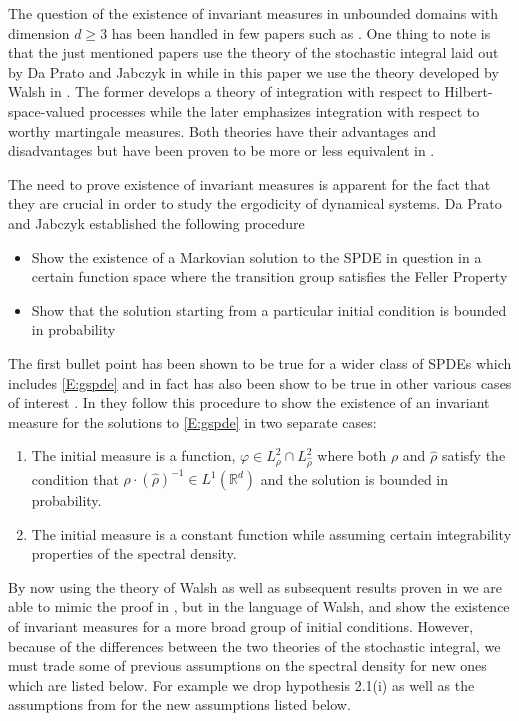 \documentclass[a4paper,11pt]{article}
\numberwithin{equation}{section}
\theoremstyle{plain}
\theoremstyle{definition}
\newcommand{\R}{\mathbb{R}}
\begin{document}
The question of the existence of invariant measures in unbounded domains with dimension $d \ge 3$ has been handled in
few papers such as \cite{TessitoreZabczyk98M, AM03, MSY15, MSY16}. One thing to note is that the just mentioned papers
use the theory of the stochastic integral laid out by Da Prato and Jabczyk in \cite{DZ92} while in this paper we use the
theory developed by Walsh in \cite{Walsh}. The former develops a theory of integration with respect to
Hilbert-space-valued processes while the later emphasizes integration with respect to worthy martingale measures. Both
theories have their advantages and disadvantages but have been proven to be more or less equivalent in \cite{DalQuer}. 

The need to prove existence of invariant measures is apparent for the fact that they are crucial in order to study the
ergodicity of dynamical systems. Da Prato and Jabczyk \cite{DZp92} established the following procedure 
\begin{itemize}
	\item Show the existence of a Markovian solution to the SPDE in question in a certain function space where the
		transition group satisfies the Feller Property 
	\item Show that the solution starting from a particular initial condition is bounded in probability
\end{itemize}
The first bullet point has been shown to be true \cite{DZ96} for a wider class of SPDEs which includes \eqref{E:gspde}
and in fact has also been show to be true in other various cases of interest \cite{Cer01, MS99}. 
In \cite{TessitoreZabczyk98M} they follow this procedure to show the existence of an invariant measure for the solutions to
\eqref{E:gspde} in two separate cases:
\begin{enumerate}
	\item The initial measure is a function, $\varphi \in L^2_\rho \cap L^2_{\hat\rho}$ where both $\rho$ and
		$\hat\rho$ satisfy the condition that $\rho \cdot (\hat\rho)^{-1} \in L^1(\R^d)$ and the solution is
		bounded in probability. 
	\item The initial measure is a constant function while assuming certain integrability properties of the spectral
		density. 
\end{enumerate} 
By now using the theory of Walsh as well as subsequent results proven in \cite{CH16Comparison} we are able to mimic the
proof in \cite{TessitoreZabczyk98M}, but in the language of Walsh, and show the existence of invariant measures for a
more broad group of initial conditions. However, because of the differences between the two theories of the stochastic
integral, we must trade some of previous assumptions on the spectral density for new ones which are listed below. For
example we drop hypothesis 2.1(i) as well as the assumptions from \cite[Theorem 3.3]{TessitoreZabczyk98M} for the new
assumptions listed below.
\end{document}
